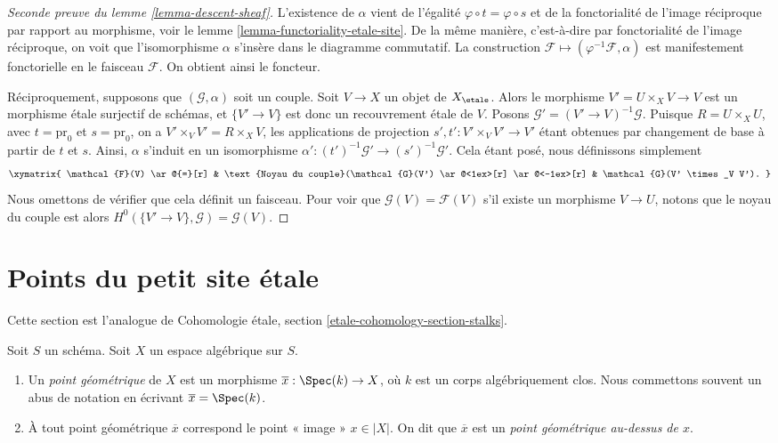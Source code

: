 \begin{proof}[Seconde preuve du lemme \ref{lemma-descent-sheaf}]
L'existence de $\alpha$ vient de l'égalité
$\varphi \circ t = \varphi \circ s$ et de la fonctorialité de l'image réciproque
par rapport au morphisme, voir le
lemme \ref{lemma-functoriality-etale-site}.
De la même manière, c'est-à-dire par fonctorialité de l'image réciproque, on voit
que l'isomorphisme $\alpha$ s'insère dans le diagramme commutatif.
La construction $\mathcal{F} \mapsto (\varphi^{-1}\mathcal{F}, \alpha)$
est manifestement fonctorielle en le faisceau $\mathcal{F}$.
On obtient ainsi le foncteur.

\medskip\noindent
Réciproquement, supposons que $(\mathcal{G}, \alpha)$ soit un couple.
Soit $V \to X$ un objet de $X_\etale$.
Alors le morphisme $V' = U \times_X V \to V$ est un morphisme \'etale surjectif
de schémas, et $\{V' \to V\}$ est donc un recouvrement \'etale
de $V$. Posons $\mathcal{G}' = (V' \to V)^{-1}\mathcal{G}$.
Puisque $R = U \times_X U$, avec $t = \text{pr}_0$
et $s = \text{pr}_0$, on a $V' \times_V V' = R \times_X V$,
les applications de projection $s', t' : V' \times_V V' \to V'$ étant obtenues par changement de base
à partir de $t$ et $s$. Ainsi, $\alpha$ s'induit en un isomorphisme
$\alpha' : (t')^{-1}\mathcal{G}' \to (s')^{-1}\mathcal{G}'$. Cela étant posé,
nous définissons simplement
$$
\xymatrix{
\mathcal{F}(V) \ar@{=}[r] &
\text{Noyau du couple}(\mathcal{G}(V') \ar@<1ex>[r] \ar@<-1ex>[r] &
\mathcal{G}(V' \times_V V').
}
$$
Nous omettons de vérifier que cela définit un faisceau. Pour voir que
$\mathcal{G}(V) = \mathcal{F}(V)$ s'il existe un morphisme $V \to U$,
notons que le noyau du couple est alors
$H^0(\{V' \to V\}, \mathcal{G}) = \mathcal{G}(V)$.
\end{proof}







\section{Points du petit site \'etale}
\label{section-points-small-etale-site}

\noindent
Cette section est l'analogue de
Cohomologie \'etale, section
\ref{etale-cohomology-section-stalks}.

\begin{definition}
\label{definition-geometric-point}
Soit $S$ un schéma. Soit $X$ un espace algébrique sur $S$.
\begin{enumerate}
\item Un {\it point géométrique} de $X$ est un morphisme
$\overline{x} : \Spec(k) \to X$, où $k$ est un corps algébriquement
clos. Nous commettons souvent un abus de notation en
écrivant $\overline{x} = \Spec(k)$.
\item À tout point géométrique $\overline{x}$ correspond le point
« image » $x \in |X|$. On dit que $\overline{x}$ est un
{\it point géométrique au-dessus de $x$}.
\end{enumerate}
\end{definition}

